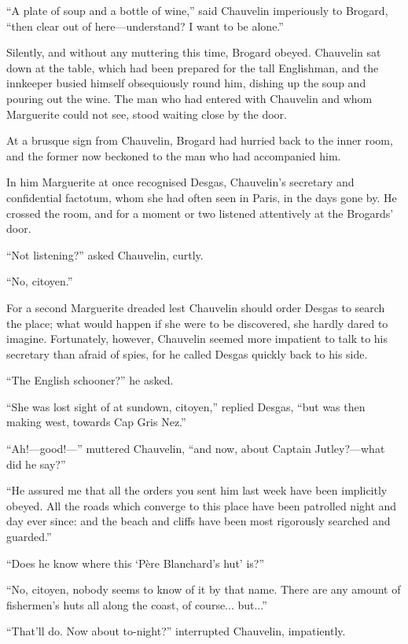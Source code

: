 \documentclass[paper=a5,BCOR=7mm,twoside,DIV=calc,12pt,usegeometry,chapterprefix,endperiod,headings=big]{scrbook}
\begin{document}
\enquote{A plate of soup and a bottle of wine,} said Chauvelin imperiously to Brogard, \enquote{then clear out of here---understand? I want to be alone.}

Silently, and without any muttering this time, Brogard obeyed. Chauvelin sat down at the table, which had been prepared for the tall Englishman, and the innkeeper busied himself obsequiously round him, dishing up the soup and pouring out the wine. The man who had entered with Chauvelin and whom Marguerite could not see, stood waiting close by the door.

At a brusque sign from Chauvelin, Brogard had hurried back to the inner room, and the former now beckoned to the man who had accompanied him.

In him Marguerite at once recognised Desgas, Chauvelin's secretary and confidential factotum, whom she had often seen in Paris, in the days gone by. He crossed the room, and for a moment or two listened attentively at the Brogards’ door.

\enquote{Not listening?} asked Chauvelin, curtly.

\enquote{No, citoyen.}

For a second Marguerite dreaded lest Chauvelin should order Desgas to search the place; what would happen if she were to be discovered, she hardly dared to imagine. Fortunately, however, Chauvelin seemed more impatient to talk to his secretary than afraid of spies, for he called Desgas quickly back to his side.

\enquote{The English schooner?} he asked.

\enquote{She was lost sight of at sundown, citoyen,} replied Desgas, \enquote{but was then making west, towards Cap Gris Nez.}

\enquote{Ah!---good!---} muttered Chauvelin, \enquote{and now, about Captain Jutley?---what did he say?}

\enquote{He assured me that all the orders you sent him last week have been implicitly obeyed. All the roads which converge to this place have been patrolled night and day ever since: and the beach and cliffs have been most rigorously searched and guarded.}

\enquote{Does he know where this \enquote{Père Blanchard's hut} is?}

\enquote{No, citoyen, nobody seems to know of it by that name. There are any amount of fishermen's huts all along the coast, of course... but...}

\enquote{That'll do. Now about to-night?} interrupted Chauvelin, impatiently.
\end{document}

